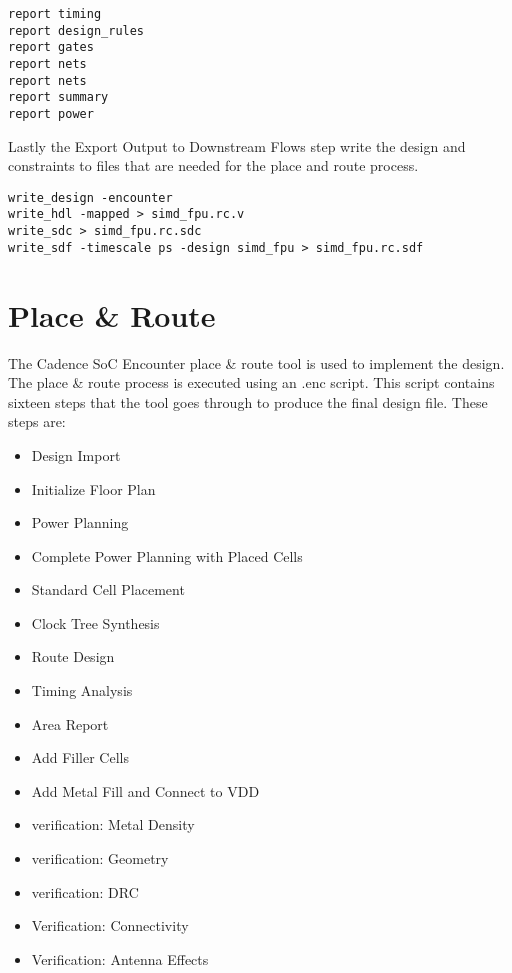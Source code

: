 \documentclass[conference]{IEEEtran}
\begin{document}
\begin{framed}
\begin{lstlisting}
report timing
report design_rules
report gates
report nets
report nets
report summary
report power
\end{lstlisting}
\end{framed}
Lastly the Export Output to Downstream Flows step write the design and constraints to files that are needed for the place and route process. 
\begin{framed}
\begin{lstlisting}
write_design -encounter
write_hdl -mapped > simd_fpu.rc.v
write_sdc > simd_fpu.rc.sdc
write_sdf -timescale ps -design simd_fpu > simd_fpu.rc.sdf
\end{lstlisting}
\end{framed}

\section{Place \& Route}

The Cadence SoC Encounter place \& route tool is used to implement the design. The place \& route process is executed using an .enc script. This script contains sixteen steps that the tool goes through to produce the final design file. These steps are:
\begin{itemize}
	\item Design Import
	\item Initialize Floor Plan
	\item Power Planning
	\item Complete Power Planning with Placed Cells
	\item Standard Cell Placement
	\item Clock Tree Synthesis
	\item Route Design
	\item Timing Analysis
	\item Area Report
	\item Add Filler Cells 
	\item Add Metal Fill and Connect to VDD
	\item verification: Metal Density
	\item verification: Geometry
	\item verification: DRC
	\item Verification: Connectivity
	\item Verification: Antenna Effects
\end{itemize}
\end{document}
